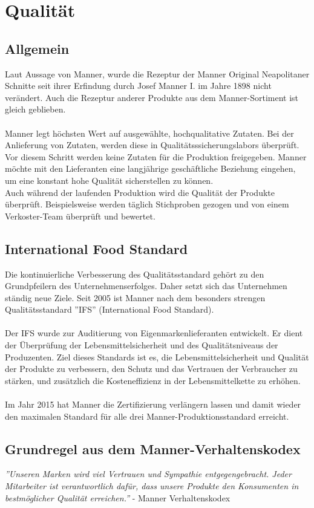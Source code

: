 \section{Qualität}
\subsection{Allgemein}
Laut Aussage von Manner, wurde die Rezeptur der Manner Original Neapolitaner Schnitte seit ihrer Erfindung durch Josef Manner I. im Jahre 1898 nicht verändert. Auch die Rezeptur anderer Produkte aus dem Manner-Sortiment ist gleich geblieben. \cite{josef_manner} \\\\
\noindent
Manner legt höchsten Wert auf ausgewählte, hochqualitative Zutaten. Bei der Anlieferung von Zutaten, werden diese in Qualitätsssicherungslabors überprüft. Vor diesem Schritt werden keine Zutaten für die Produktion freigegeben. Manner möchte mit den Lieferanten eine langjährige geschäftliche Beziehung eingehen, um eine konstant hohe Qualität sicherstellen zu können. \cite{josef_manner} \\
Auch während der laufenden Produktion wird die Qualität der Produkte überprüft. Beispielsweise werden täglich Stichproben gezogen und von einem Verkoster-Team überprüft und bewertet. \cite{josef_manner}
\subsection{International Food Standard}
Die kontinuierliche Verbesserung des Qualitätsstandard gehört zu den Grundpfeilern des Unternehmenserfolges. Daher setzt sich das Unternehmen ständig neue Ziele. Seit 2005 ist Manner nach dem besonders strengen Qualitätsstandard ''IFS'' (International Food Standard).\cite{josef_manner}\\\\
\noindent
Der IFS wurde zur Auditierung von Eigenmarkenlieferanten entwickelt. Er dient der Überprüfung der Lebensmittelsicherheit und des Qualitätsniveaus der Produzenten. Ziel dieses Standards ist es, die Lebensmittelsicherheit und Qualität der Produkte zu verbessern, den Schutz und das Vertrauen der Verbraucher zu stärken, und zusätzlich die Kosteneffizienz in der Lebensmittelkette zu erhöhen. \cite{qualityaustria_ifs}\\\\
Im Jahr 2015 hat Manner die Zertifizierung verlängern lassen und damit wieder den maximalen Standard für alle drei Manner-Produktionsstandard erreicht.
\subsection{Grundregel aus dem Manner-Verhaltenskodex}

\textit{''Unseren Marken wird viel Vertrauen und Sympathie entgegengebracht. Jeder Mitarbeiter ist verantwortlich dafür, dass unsere Produkte den Konsumenten in bestmöglicher Qualität erreichen.''} - Manner Verhaltenskodex \cite{josef_manner}